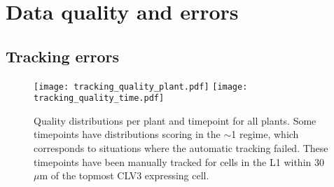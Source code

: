 

\ifpdf
\graphicspath{{Appendix1/Figs/Raster/}{Appendix1/Figs/PDF/}{Appendix1/Figs/}}
\else
\graphicspath{{Appendix1/Figs/Vector/}{Appendix1/Figs/}}
\fi



\chapter{Data quality and errors} 



\section{Tracking errors}
\label{sec:data_errors}
\begin{figure}[p]
    \centering
        \centering
        \texttt{[image: tracking\_quality\_plant.pdf]}
        \centering
        \texttt{[image: tracking\_quality\_time.pdf]} %
        \caption[Tracking quality]{Quality distributions per plant and timepoint for all plants.
        Some timepoints have distributions scoring in the $\sim$1 regime, which
        corresponds to situations where the automatic tracking failed. These
        timepoints have been manually tracked for cells in the L1 within 30
        $\mu$m of the topmost CLV3 expressing cell.}
\end{figure}

